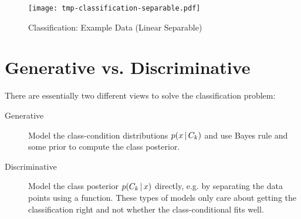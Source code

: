 	\begin{figure}
		\centering
		\texttt{[image: tmp-classification-separable.pdf]}
		\caption{Classification: Example Data (Linear Separable)}
		\label{fig:classificationExampleSeparable}
	\end{figure}

	\section{Generative vs. Discriminative}
		There are essentially two different views to solve the classification problem:
		\begin{description}
			\item[Generative] Model the class-condition distributions \( p(x \,\vert\, C_k) \) and use Bayes rule and some prior to compute the class posterior.
			\item[Discriminative] Model the class posterior \( p(C_k \,\vert\, x) \) directly, e.g. by separating the data points using a function. These types of models only care about getting the classification right and not whether the class-conditional fits well.
		\end{description}

